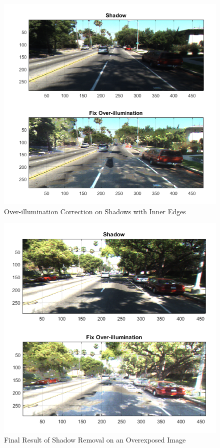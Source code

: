 \documentclass[11pt,journal]{IEEEtran}
\begin{document}
\begin{figure}[ht]
\centerline{\includegraphics[width=0.9\columnwidth]{X4.png}}
\caption{Over-illumination Correction on Shadows with Inner Edges}
\label{Shadow4}
\end{figure}

\begin{figure}[ht]
\centerline{\includegraphics[width=0.9\columnwidth]{X5.png}}
\caption{Final Result of Shadow Removal on an Overexposed Image}
\label{Shadow5}
\end{figure}
\end{document}
